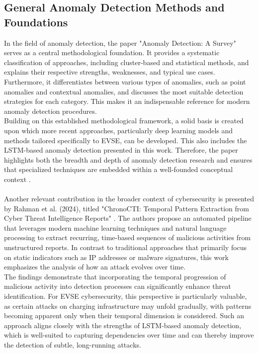 \subsection{General Anomaly Detection Methods and Foundations}

In the field of anomaly detection, the paper "Anomaly Detection: A Survey" \cite{paper_AnomalyDetection_Northwestern} serves as a central methodological foundation. It provides a systematic classification of approaches, including cluster-based and statistical methods, and explains their respective strengths, weaknesses, and typical use cases. Furthermore, it differentiates between various types of anomalies, such as point anomalies and contextual anomalies, and discusses the most suitable detection strategies for each category. This makes it an indispensable reference for modern anomaly detection procedures.\\
Building on this established methodological framework, a solid basis is created upon which more recent approaches, particularly deep learning models and methods tailored specifically to EVSE, can be developed. This also includes the LSTM-based anomaly detection presented in this work. Therefore, the paper highlights both the breadth and depth of anomaly detection research and ensures that specialized techniques are embedded within a well-founded conceptual context \cite{paper_AnomalyDetection_Northwestern}.\\
\\
Another relevant contribution in the broader context of cybersecurity is presented by Rahman et al. (2024), titled "ChronoCTI: Temporal Pattern Extraction from Cyber Threat Intelligence Reports" \cite{attack_over_time}. The authors propose an automated pipeline that leverages modern machine learning techniques and natural language processing to extract recurring, time-based sequences of malicious activities from unstructured reports. In contrast to traditional approaches that primarily focus on static indicators such as IP addresses or malware signatures, this work emphasizes the analysis of how an attack evolves over time.\\
The findings demonstrate that incorporating the temporal progression of malicious activity into detection processes can significantly enhance threat identification. For EVSE cybersecurity, this perspective is particularly valuable, as certain attacks on charging infrastructure may unfold gradually, with patterns becoming apparent only when their temporal dimension is considered. Such an approach aligns closely with the strengths of LSTM-based anomaly detection, which is well-suited to capturing dependencies over time and can thereby improve the detection of subtle, long-running attacks.
